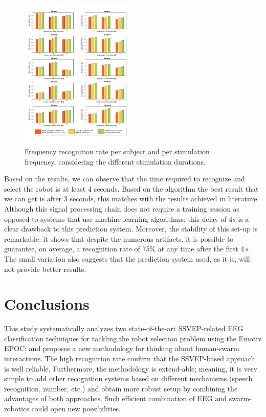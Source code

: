 \documentclass{svmult}
\begin{document}
\begin{figure}
\center
\includegraphics[width=0.5\textwidth]{figures/all-results-reconn.pdf}
\caption{Frequency recognition rate per subject and per stimulation frequency, considering the different stimulation durations.}
\label{fig:all-results-reconn}
\end{figure}

Based on the results, we can observe that the time required to recognize and select the robot is at least 4 seconds. Based on the algorithm the best result that we can get is after 3 seconds, this matches with the results achieved in literature. Although this signal processing chain does not require a training session as opposed to systems that use machine learning algorithms; this delay of 4$s$ is a clear drawback to this prediction system. Moreover, the stability of this set-up is remarkable: it shows that despite the numerous artifacts, it is possible to guarantee, on average, a recognition rate of 75\% at any time after the first $4\,s$. The small variation also suggests that the prediction system used, as it is, will not provide better results. 

\section{Conclusions}
This study systematically analyzes two state-of-the-art SSVEP-related EEG classification techniques for tackling the robot selection problem using the Emotiv EPOC; and proposes a new methodology for thinking about human-swarm interactions. The high recognition rate confirm that the SSVEP-based approach is well reliable. Furthermore, the methodology is extend-able; meaning, it is very simple to add other recognition systems based on different mechanisms (speech recognition, number, etc.) and obtain more robust setup by combining the advantages of both approaches. Such efficient combination of EEG and swarm-robotics could open new possibilities.\\
\end{document}
